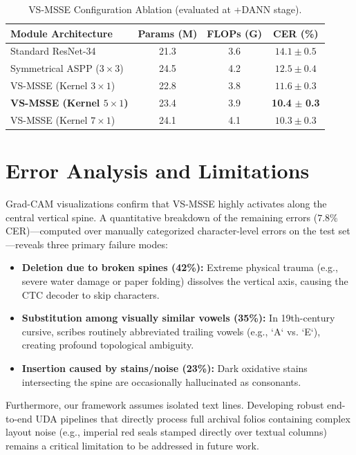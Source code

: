\documentclass[11pt]{article}
\begin{document}
\begin{table}[htbp]
\centering
\caption{VS-MSSE Configuration Ablation (evaluated at +DANN stage).}
\label{tab:msse_ablation}
\begin{tabular}{l c c c}
\toprule
\textbf{Module Architecture} & \textbf{Params (M)} & \textbf{FLOPs (G)} & \textbf{CER (\%)} \\
\midrule
Standard ResNet-34 & 21.3 & 3.6 & $14.1 \pm 0.5$ \\
Symmetrical ASPP ($3\times3$) & 24.5 & 4.2 & $12.5 \pm 0.4$ \\
VS-MSSE (Kernel $3\times1$) & 22.8 & 3.8 & $11.6 \pm 0.3$ \\
\textbf{VS-MSSE (Kernel $5\times1$)} & 23.4 & 3.9 & \textbf{10.4} $\pm$ \textbf{0.3} \\
VS-MSSE (Kernel $7\times1$) & 24.1 & 4.1 & $10.3 \pm 0.3$ \\
\bottomrule
\end{tabular}
\end{table}

\section{Error Analysis and Limitations}
Grad-CAM visualizations confirm that VS-MSSE highly activates along the central vertical spine. A quantitative breakdown of the remaining errors ($7.8\%$ CER)—computed over manually categorized character-level errors on the test set—reveals three primary failure modes:
\begin{itemize}[noitemsep,topsep=0pt]
    \item \textbf{Deletion due to broken spines (42\%):} Extreme physical trauma (e.g., severe water damage or paper folding) dissolves the vertical axis, causing the CTC decoder to skip characters.
    \item \textbf{Substitution among visually similar vowels (35\%):} In 19th-century cursive, scribes routinely abbreviated trailing vowels (e.g., `A` vs. `E`), creating profound topological ambiguity.
    \item \textbf{Insertion caused by stains/noise (23\%):} Dark oxidative stains intersecting the spine are occasionally hallucinated as consonants.
\end{itemize}
Furthermore, our framework assumes isolated text lines. Developing robust end-to-end UDA pipelines that directly process full archival folios containing complex layout noise (e.g., imperial red seals stamped directly over textual columns) remains a critical limitation to be addressed in future work.
\end{document}
